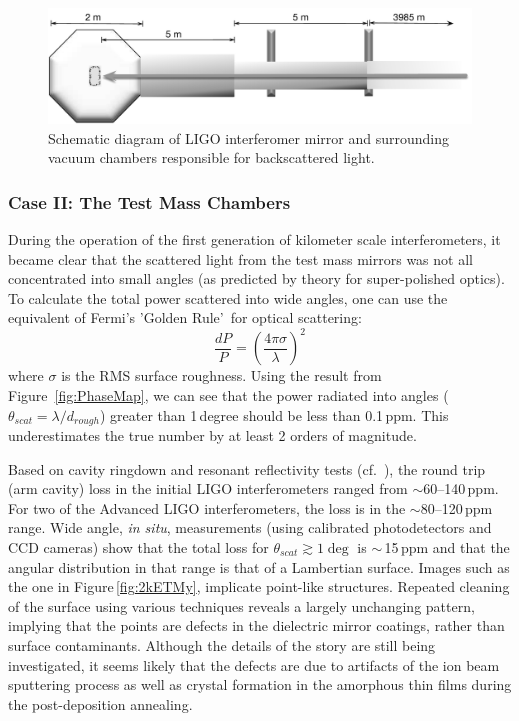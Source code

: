 \begin{figure}[h]
  \centering
    \includegraphics[width=\columnwidth]{Figures/ETM_scatter-BW.pdf}
    \caption{Schematic diagram of LIGO interferomer mirror and surrounding vacuum chambers responsible for backscattered light.}
    \label{fig:ETMscat}
\end{figure}



\subsubsection{Case II: The Test Mass Chambers}
During the operation of the first generation of kilometer scale interferometers,
it became clear that the scattered light from the test mass mirrors was not
all concentrated into small angles (as predicted by theory for super-polished
optics). To calculate the total power scattered into wide angles, one can use the
equivalent of Fermi's 'Golden Rule'\,\cite{Weiss:Scatter97} for optical scattering:
\begin{equation}
\frac{dP}{P} = \left( \frac{4 \pi \sigma}{\lambda} \right)^2
\end{equation}
where $\sigma$ is the RMS surface roughness. Using the result from
Figure~\ref{fig:PhaseMap}, we can see that the power radiated into
angles ($\theta_{scat} = \lambda / d_{rough}$) greater than 1\,degree should be
less than 0.1\,ppm. This underestimates the true number by at least 2 orders of magnitude.

Based on cavity ringdown and resonant reflectivity tests (cf.~\cite{Isogai2013}),
the round trip (arm cavity) loss in the initial LIGO interferometers ranged from
$\sim$60--140\,ppm. For two of the Advanced LIGO interferometers, the loss
is in the $\sim$80--120\,ppm range. Wide angle, \textit{in situ},
measurements (using calibrated photodetectors and CCD cameras) show
that the total loss for $\theta_{scat} \gtrsim 1\deg$ is $\sim$\,15\,ppm and that
the angular distribution in that range is that of a Lambertian surface. Images
such as the one in Figure\,\ref{fig:2kETMy}, implicate point-like structures.
Repeated cleaning of the surface using various techniques reveals a largely
unchanging pattern, implying that the points are defects in the dielectric
mirror coatings, rather than surface contaminants. Although the details of the
story are still being investigated, it seems likely that the defects are due to
artifacts of the ion beam sputtering process as well as crystal formation in the
amorphous thin films during the post-deposition annealing.

